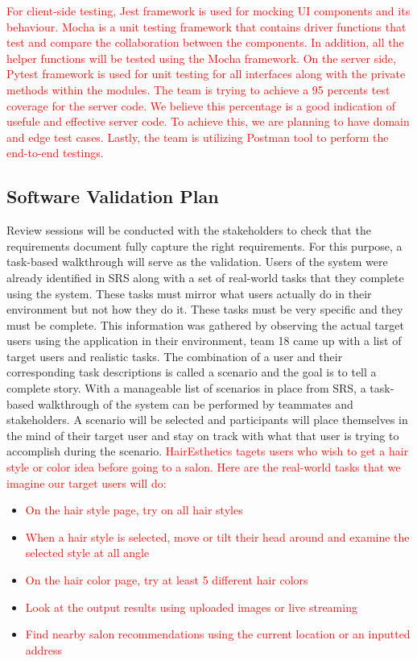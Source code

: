 \documentclass[12pt, titlepage]{article}
\begin{document}
\textcolor{red}{For client-side testing, Jest framework is used for mocking UI components and its behaviour. Mocha is a unit testing framework that contains driver functions that test and compare the collaboration between the components. In addition, all the helper functions will be tested using the Mocha framework. On the server side, Pytest framework is used for unit testing for all interfaces along with the private methods within the modules. The team is trying to achieve a 95 percents test coverage for the server code. We believe this percentage is a good indication of usefule and effective server code. To achieve this, we are planning to have domain and edge test cases. Lastly, the team is utilizing Postman tool to perform the end-to-end testings.}

\subsection{Software Validation Plan}

\noindent Review sessions will be conducted with the stakeholders to check that the requirements document fully capture the right requirements. For this purpose, a task-based walkthrough will serve as the validation. Users of the system were already identified in SRS along with a set of real-world tasks that they complete using the system. These tasks must mirror what users actually do in their environment but not how they do it. These tasks must be very specific and they must be complete. This information was gathered by observing the actual target users using the application in their environment, team 18 came up with a list of target users and realistic tasks. The combination of a user and their corresponding task descriptions is called a scenario and the goal is to tell a complete story.
With a manageable list of scenarios in place from SRS, a task-based walkthrough of the system can be performed by teammates and stakeholders. A scenario will be selected and participants will place themselves in the mind of their target user and stay on track with what that user is trying to accomplish during the scenario. \textcolor{red}{HairEsthetics tagets users who wish to get a hair style or color idea before going to a salon. Here are the real-world tasks that we imagine our target users will do:} 
\begin{itemize}
    \item \textcolor{red}{On the hair style page, try on all hair styles}
    \item \textcolor{red}{When a hair style is selected, move or tilt their head around and examine the selected style at all angle}
    \item \textcolor{red}{On the hair color page, try at least 5 different hair colors}
    \item \textcolor{red}{Look at the output results using uploaded images or live streaming}
    \item \textcolor{red}{Find nearby salon recommendations using the current location or an inputted address}
\end{itemize}
\end{document}
